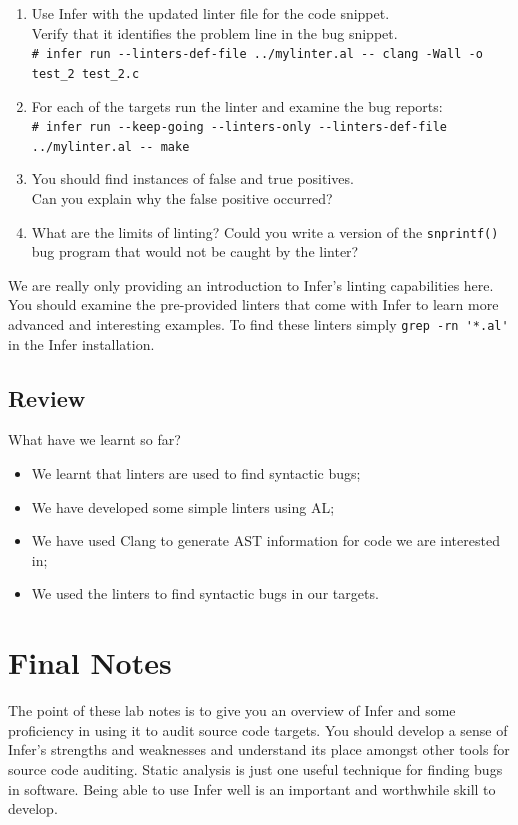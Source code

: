 \begin{enumerate}
	\item Use Infer with the updated linter file for the code snippet.\\
	Verify that it identifies the problem line in the bug snippet.\\
	\verb|# infer run --linters-def-file ../mylinter.al -- clang -Wall -o test_2 test_2.c|
	\item For each of the targets run the linter and examine the bug reports:\\
	\verb|# infer run --keep-going --linters-only --linters-def-file ../mylinter.al -- make|
	\item You should find instances of false and true positives.\\ 
	Can you explain why the false positive occurred? 
	\item What are the limits of linting? Could you write a version of the \verb|snprintf()| bug 
	program that would not be caught by the linter?
\end{enumerate}

We are really only providing an introduction to Infer's linting capabilities here. 
You should examine the pre-provided linters that come with Infer to learn
more advanced and interesting examples. To find these linters simply \verb|grep -rn '*.al'|
in the Infer installation.

\subsection{Review}

What have we learnt so far?

\begin{itemize}
\item We learnt that linters are used to find syntactic bugs;
\item We have developed some simple linters using AL;
\item We have used Clang to generate AST information for code we are interested in;
\item We used the linters to find syntactic bugs in our targets.
\end{itemize}

\section{Final Notes}

The point of these lab notes is to give you an overview of Infer and some 
proficiency in using it to audit source code targets. You should develop
a sense of Infer's strengths and weaknesses and understand its place
amongst other tools for source code auditing. Static analysis is just one
useful technique for finding bugs in software. Being able to use Infer
well is an important and worthwhile skill to develop.

